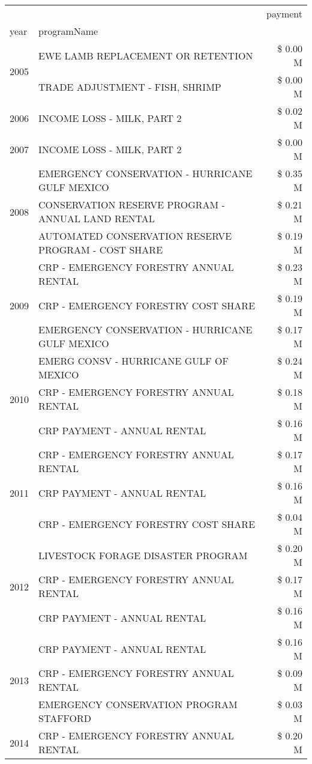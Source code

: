 \begin{tabular}{llr}
\toprule
 &  & payment \\
year & programName &  \\
\midrule
\multirow[t]{2}{*}{2005} & EWE LAMB REPLACEMENT OR RETENTION & \$ 0.00 M \\
 & TRADE ADJUSTMENT - FISH, SHRIMP & \$ 0.00 M \\
\cline{1-3}
2006 & INCOME LOSS - MILK, PART 2 & \$ 0.02 M \\
\cline{1-3}
2007 & INCOME LOSS - MILK, PART 2 & \$ 0.00 M \\
\cline{1-3}
\multirow[t]{3}{*}{2008} & EMERGENCY CONSERVATION - HURRICANE GULF MEXICO & \$ 0.35 M \\
 & CONSERVATION RESERVE PROGRAM - ANNUAL LAND RENTAL & \$ 0.21 M \\
 & AUTOMATED CONSERVATION RESERVE PROGRAM - COST SHARE & \$ 0.19 M \\
\cline{1-3}
\multirow[t]{3}{*}{2009} & CRP - EMERGENCY FORESTRY ANNUAL RENTAL & \$ 0.23 M \\
 & CRP - EMERGENCY FORESTRY COST SHARE & \$ 0.19 M \\
 & EMERGENCY CONSERVATION - HURRICANE GULF MEXICO & \$ 0.17 M \\
\cline{1-3}
\multirow[t]{3}{*}{2010} & EMERG CONSV - HURRICANE GULF OF MEXICO & \$ 0.24 M \\
 & CRP - EMERGENCY FORESTRY ANNUAL RENTAL & \$ 0.18 M \\
 & CRP PAYMENT - ANNUAL RENTAL & \$ 0.16 M \\
\cline{1-3}
\multirow[t]{3}{*}{2011} & CRP - EMERGENCY FORESTRY ANNUAL RENTAL & \$ 0.17 M \\
 & CRP PAYMENT - ANNUAL RENTAL & \$ 0.16 M \\
 & CRP - EMERGENCY FORESTRY COST SHARE & \$ 0.04 M \\
\cline{1-3}
\multirow[t]{3}{*}{2012} & LIVESTOCK FORAGE DISASTER PROGRAM & \$ 0.20 M \\
 & CRP - EMERGENCY FORESTRY ANNUAL RENTAL & \$ 0.17 M \\
 & CRP PAYMENT - ANNUAL RENTAL & \$ 0.16 M \\
\cline{1-3}
\multirow[t]{3}{*}{2013} & CRP PAYMENT - ANNUAL RENTAL & \$ 0.16 M \\
 & CRP - EMERGENCY FORESTRY ANNUAL RENTAL & \$ 0.09 M \\
 & EMERGENCY CONSERVATION PROGRAM STAFFORD & \$ 0.03 M \\
\cline{1-3}
\multirow[t]{3}{*}{2014} & CRP - EMERGENCY FORESTRY ANNUAL RENTAL & \$ 0.20 M \\

\end{tabular}
